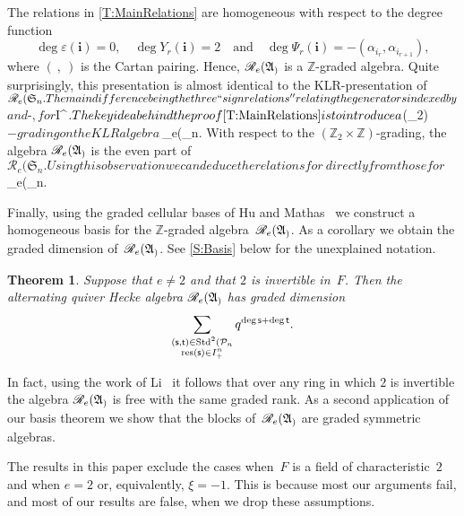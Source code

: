 \documentclass[leqno]{amsart}
\theoremstyle{plain}
\newcounter{mainTheorem}
\newtheorem{MainTheorem}[mainTheorem]{Theorem}
\numberwithin{mainCorollary}{mainTheorem}
\numberwithin{equation}{section}
{\newaliascnt{{Assumption}}{equation}
\newtheorem{{Assumption}}[{Assumption}]{{Assumption}}
\aliascntresetthe{{Assumption}}
\expandafterautorefname\endcsname{{Assumption}}
}
{\newaliascnt{{Proposition}}{equation}
\newtheorem{{Proposition}}[{Proposition}]{{Proposition}}
\aliascntresetthe{{Proposition}}
\expandafterautorefname\endcsname{{Proposition}}
}
{\newaliascnt{{Theorem}}{equation}
\newtheorem{{Theorem}}[{Theorem}]{{Theorem}}
\aliascntresetthe{{Theorem}}
\expandafterautorefname\endcsname{{Theorem}}
}
{\newaliascnt{{Corollary}}{equation}
\newtheorem{{Corollary}}[{Corollary}]{{Corollary}}
\aliascntresetthe{{Corollary}}
\expandafterautorefname\endcsname{{Corollary}}
}
{\newaliascnt{{Conjecture}}{equation}
\newtheorem{{Conjecture}}[{Conjecture}]{{Conjecture}}
\aliascntresetthe{{Conjecture}}
\expandafterautorefname\endcsname{{Conjecture}}
}
{\newaliascnt{{Lemma}}{equation}
\newtheorem{{Lemma}}[{Lemma}]{{Lemma}}
\aliascntresetthe{{Lemma}}
\expandafterautorefname\endcsname{{Lemma}}
}
\theoremstyle{definition}
{\newaliascnt{{Definition}}{equation}
\newtheorem{{Definition}}[{Definition}]{{Definition}}
\aliascntresetthe{{Definition}}
\expandafterautorefname\endcsname{{Definition}}
}
\theoremstyle{remark}
{\newaliascnt{{Remark}}{equation}
\newtheorem{{Remark}}[{Remark}]{{Remark}}
\aliascntresetthe{{Remark}}
\expandafterautorefname\endcsname{{Remark}}
}
\let\eps=\varepsilon
\begin{document}
  The relations in \autoref{T:MainRelations} are homogeneous with respect
  to the degree function
  \[
  \deg \eps({\mathbf{i}})=0, \quad \deg Y_r({\mathbf{i}})=2\quad\text{and}\quad
  \deg\Psi_r({\mathbf{i}})=-(\alpha_{i_r},\alpha_{i_{r+1}}),
  \]
  where $(\ ,\ )$ is the Cartan pairing. Hence, $\RAn$ is a ${\mathbb{Z}}$-graded
  algebra. Quite surprisingly, this presentation is almost identical to
  the KLR-presentation of~${\mathscr{R}_e({\mathfrak{S}_{n}}}. The main difference being the three
  ``sign relations'' relating the generators indexed by ${}$ and $-{}$, for
  ${}\in I^\gamma$. The key idea behind the proof
  \autoref{T:MainRelations} is to introduce a $({}_2)$-grading on
  the KLR algebra~${_e({_{n}}}. With respect to the $({\mathbb{Z}}_2\times{\mathbb{Z}})$-grading,
  the algebra $\RAn$ is the even part of~${\mathscr{R}_e({\mathfrak{S}_{n}}}. Using this observation
  we can deduce the relations for~$\RAn$ directly from those for~${_e({_{n}}}.

  Finally, using the graded cellular bases of Hu and
  Mathas~\cite{HuMathas:GradedCellular} we construct a homogeneous basis
  for the ${\mathbb{Z}}$-graded algebra~$\RAn$. As a corollary we obtain the
  graded dimension of~$\RAn$. See \autoref{S:Basis} below for the
  unexplained notation.

  \begin{MainTheorem}\label{T:GDim}
    Suppose that $e\ne2$ and that $2$ is invertible in~$F$. Then the
    alternating quiver Hecke algebra $\RAn$ has graded dimension
    \[
    \sum_{\substack{({\mathsf{s}},{\mathsf{t}})\in{\mathop{\rm Std}\nolimits}^2({\mathcal{P}_{n}}\\\operatorname{res}({\mathsf{s}})\in I^n_+}}
    q^{\deg{\mathsf{s}}+\deg{\mathsf{t}}}.
    \]
  \end{MainTheorem}

  In fact, using the work of Li~\cite{GeLi:IntegralKLR} it follows that
  over any ring in which $2$ is invertible the algebra $\RAn$ is free
  with the same graded rank. As a second application of our basis
  theorem we show that the blocks of~$\RAn$ are graded symmetric
  algebras.

  The results in this paper exclude the cases when~$F$ is a field of
  characteristic~$2$ and when $e=2$ or, equivalently, $\xi=-1$.  This is
  because most our arguments fail, and most of our results are false,
  when we drop these assumptions.
\end{document}

